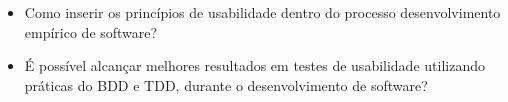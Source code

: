 \begin{itemize}
\item Como inserir os princípios de usabilidade dentro do processo desenvolvimento empírico de software?
\item É possível alcançar melhores resultados em testes de usabilidade utilizando práticas do BDD e TDD, durante o desenvolvimento de software?
\end{itemize}

\begin{comment}
Segundo ~\citeonline{siegel2010} para ser defensor de UX você não precisa criar  \textit{mockups} perfeitos no Inkscape \footnote{Inkscape - Aplicativo de edição de imagens} e nem ter um bom conhecimento de HCI. Para ele tudo que você precisa é de amor por um projeto \textit{open source} e as pessoas que a usam, sendo paciente, persistente e persuasivo.É útil ter alguém com conhecimento em experiência do usuário mas muitas vezes é desnecessário. É melhor para um projeto \textit{open source} ter um defensor UX novato do que nenhum.

	Os defensores em usabilidade não precisam ser desenvolvedores e nem sequer precisa ser um especialista em usabilidade. É preciso tempo, energia e disposição para obter uma boa experiência do usuário. O defensor de UX pode filtrar e priorizar erros UX, pesquisar problemas de design e realizar testes com os usuário ~\cite{day2010}.

	Muitos desenvolvedores de software livre já sabem da importância da usabilidade, mas não sabem como melhorá-la. ~\citeonline{andreasen2006} diz que um grande problema de se trabalhar com eles é a falta de confiança e por isso é preciso comunicar abertamente suas descobertas e métodos. 

	Gravação de testes de usabilidade ou entrevistas para ter citações de usuários para apresentação é uma prática comum em agências de usabilidade no qual é necessário assinar um formulário de concessão de uso da imagem. Para ~\citeonline{borchardt2011} em projetos de software livre independentes, as gravações de participantes são bastante inúteis, pois criam muito trabalho apenas para apresentação, além de que rever as gravações levaria o dobro de tempo.

	No desenvolvimento de software livre uma das vantagens na apresentação dos resultados de forma rápida e sem a necessidade de elaborar um relatório um uma apresentação. A comunicação pode ser feita diretamente com os desenvolvedores sobre os problemas encontrados e fazer iterações rápidas com base em sugestões ~\cite{borchardt2011}.
\end{comment}

